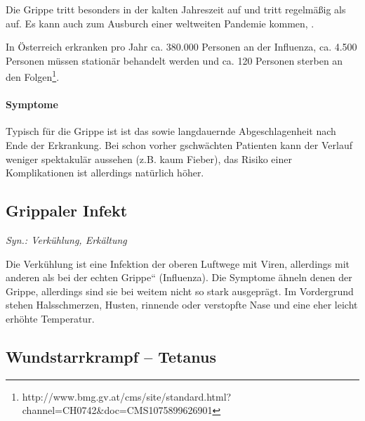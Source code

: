 
Die Grippe tritt besonders in der kalten Jahreszeit auf und tritt
regelm\"a{\ss}ig als  auf. Es
kann auch zum Ausburch einer weltweiten Pandemie kommen, .

In \"Osterreich erkranken pro Jahr ca. 380.000 Personen an der
Influenza, ca. 4.500 Personen m\"ussen station\"ar behandelt werden und
ca. 120 Personen sterben an den
Folgen\footnote{http://www.bmg.gv.at/cms/site/standard.html?channel=CH0742\&doc=CMS1075899626901}.



\paragraph{Symptome}

Typisch f\"ur die Grippe ist ist das  sowie langdauernde Abgeschlagenheit nach
Ende der Erkrankung. Bei schon vorher gschw\"achten Patienten kann der Verlauf
weniger spektakul\"ar aussehen (z.B. kaum Fieber), das
Risiko einer Komplikationen ist allerdings nat\"urlich h\"oher. 

\subsection{Grippaler Infekt}

\emph{Syn.: Verk\"uhlung,
 Erk\"altung} 

Die Verk\"uhlung ist eine Infektion der oberen Luftwege mit Viren,
allerdings mit anderen als bei der {\quotedblbase}echten
Grippe{\textquotedblleft} (Influenza). Die Symptome \"ahneln denen der
Grippe, allerdings sind sie bei weitem nicht so stark ausgepr\"agt. Im
Vordergrund stehen Halsschmerzen, Husten, rinnende oder verstopfte Nase
und eine eher leicht erh\"ohte Temperatur. 

\subsection{Wundstarrkrampf --
Tetanus}

